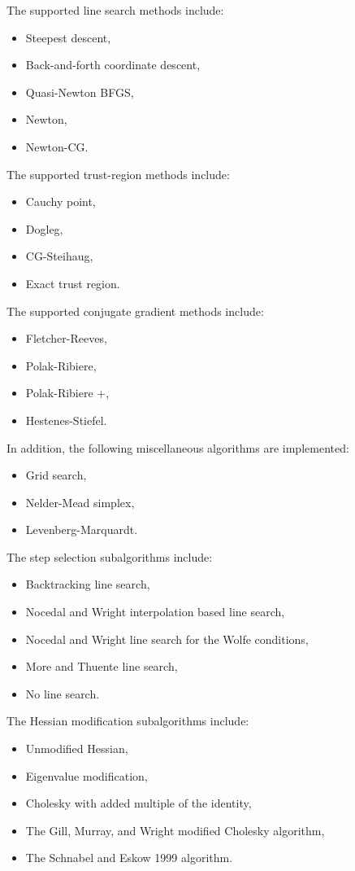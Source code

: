 The supported line search methods include:
\begin{itemize}
\item Steepest descent,
\item Back-and-forth coordinate descent,
\item Quasi-Newton BFGS,
\item Newton,
\item Newton-CG.
\end{itemize}

The supported trust-region methods include:
\begin{itemize}
\item Cauchy point,
\item Dogleg,
\item CG-Steihaug,
\item Exact trust region.
\end{itemize}

The supported conjugate gradient methods include:
\begin{itemize}
\item Fletcher-Reeves,
\item Polak-Ribiere,
\item Polak-Ribiere +,
\item Hestenes-Stiefel.
\end{itemize}

In addition, the following miscellaneous algorithms are implemented:
\begin{itemize}
\item Grid search,
\item Nelder-Mead simplex,
\item Levenberg-Marquardt.
\end{itemize}

The step selection subalgorithms include:
\begin{itemize}
\item Backtracking line search,
\item Nocedal and Wright interpolation based line search,
\item Nocedal and Wright line search for the Wolfe conditions,
\item More and Thuente line search,
\item No line search.
\end{itemize}

The Hessian modification subalgorithms include: 
\begin{itemize}
\item Unmodified Hessian,
\item Eigenvalue modification,
\item Cholesky with added multiple of the identity,
\item The Gill, Murray, and Wright modified Cholesky algorithm,
\item The Schnabel and Eskow 1999 algorithm.
\end{itemize}

